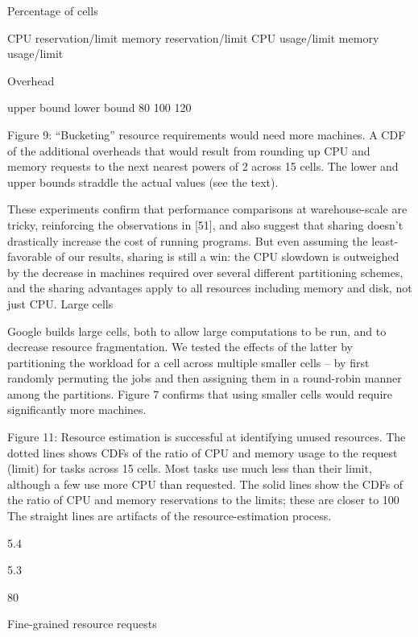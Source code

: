 Percentage of cells

CPU reservation/limit
memory reservation/limit
CPU usage/limit
memory usage/limit

Overhead

upper bound
lower bound
80
100 120

Figure 9: “Bucketing” resource requirements would need more
machines. A CDF of the additional overheads that would result
from rounding up CPU and memory requests to the next nearest
powers of 2 across 15 cells. The lower and upper bounds straddle
the actual values (see the text).

These experiments confirm that performance comparisons at warehouse-scale are tricky, reinforcing the observations in [51], and also suggest that sharing doesn’t drastically
increase the cost of running programs.
But even assuming the least-favorable of our results, sharing is still a win: the CPU slowdown is outweighed by the
decrease in machines required over several different partitioning schemes, and the sharing advantages apply to all resources including memory and disk, not just CPU.
Large cells

Google builds large cells, both to allow large computations
to be run, and to decrease resource fragmentation. We tested
the effects of the latter by partitioning the workload for a cell
across multiple smaller cells – by first randomly permuting
the jobs and then assigning them in a round-robin manner
among the partitions. Figure 7 confirms that using smaller
cells would require significantly more machines.

Figure 11: Resource estimation is successful at identifying unused
resources. The dotted lines shows CDFs of the ratio of CPU and
memory usage to the request (limit) for tasks across 15 cells. Most
tasks use much less than their limit, although a few use more CPU
than requested. The solid lines show the CDFs of the ratio of CPU
and memory reservations to the limits; these are closer to 100%
The straight lines are artifacts of the resource-estimation process.

5.4

5.3

80

Fine-grained resource requests

